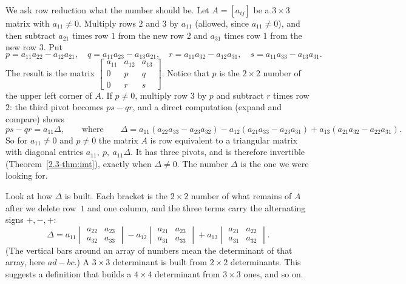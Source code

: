 \documentclass[11pt]{article}
\begin{document}
We ask row reduction what the number should be. Let $A=[a_{ij}]$ be a $3\times3$ matrix with $a_{11}\neq0$. Multiply rows $2$ and $3$ by $a_{11}$ (allowed, since $a_{11}\neq0$), and then subtract $a_{21}$ times row $1$ from the new row $2$ and $a_{31}$ times row $1$ from the new row $3$. Put
\[
p=a_{11}a_{22}-a_{12}a_{21},\quad q=a_{11}a_{23}-a_{13}a_{21},\quad r=a_{11}a_{32}-a_{12}a_{31},\quad s=a_{11}a_{33}-a_{13}a_{31}.
\]
The result is the matrix $\begin{bmatrix}a_{11}&a_{12}&a_{13}\\0&p&q\\0&r&s\end{bmatrix}$. Notice that $p$ is the $2\times2$ number of the upper left corner of $A$. If $p\neq0$, multiply row $3$ by $p$ and subtract $r$ times row $2$: the third pivot becomes $ps-qr$, and a direct computation (expand and compare) shows
\[
ps-qr=a_{11}\Delta,\qquad\text{where}\qquad
\Delta=a_{11}(a_{22}a_{33}-a_{23}a_{32})-a_{12}(a_{21}a_{33}-a_{23}a_{31})+a_{13}(a_{21}a_{32}-a_{22}a_{31}).
\]
So for $a_{11}\neq0$ and $p\neq0$ the matrix $A$ is row equivalent to a triangular matrix with diagonal entries $a_{11},\ p,\ a_{11}\Delta$. It has three pivots, and is therefore invertible (Theorem~\ref{2.3-thm:imt}), exactly when $\Delta\neq0$. The number $\Delta$ is the one we were looking for.

Look at how $\Delta$ is built. Each bracket is the $2\times2$ number of what remains of $A$ after we delete row~$1$ and one column, and the three terms carry the alternating signs $+,-,+$:
\begin{equation}\label{eq:delta}
\Delta=a_{11}\begin{vmatrix}a_{22}&a_{23}\\a_{32}&a_{33}\end{vmatrix}-a_{12}\begin{vmatrix}a_{21}&a_{23}\\a_{31}&a_{33}\end{vmatrix}+a_{13}\begin{vmatrix}a_{21}&a_{22}\\a_{31}&a_{32}\end{vmatrix}.
\end{equation}
(The vertical bars around an array of numbers mean the determinant of that array, here $ad-bc$.) A $3\times3$ determinant is built from $2\times2$ determinants. This suggests a definition that builds a $4\times4$ determinant from $3\times3$ ones, and so on.
\end{document}
